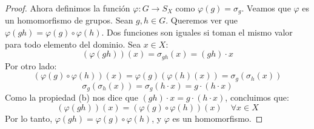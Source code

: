 \begin{proof}
    Ahora definimos la función $\varphi: G \to S_X$ como $\varphi(g) = \sigma_g$.
    Veamos que $\varphi$ es un homomorfismo de grupos.
    Sean $g, h \in G$. Queremos ver que $\varphi(gh) = \varphi(g) \circ \varphi(h)$.
    Dos funciones son iguales si toman el mismo valor para todo elemento del dominio. Sea $x \in X$:
    \begin{equation*}
        (\varphi(gh))(x) = \sigma_{gh}(x) = (gh) \cdot x
    \end{equation*}
    Por otro lado:
    \begin{equation*}
        (\varphi(g) \circ \varphi(h))(x) = \varphi(g)(\varphi(h)(x)) = \sigma_g(\sigma_h(x))
    \end{equation*}
    \begin{equation*}
        \sigma_g(\sigma_h(x)) = \sigma_g(h \cdot x) = g \cdot (h \cdot x)
    \end{equation*}
    Como la propiedad (b) nos dice que $(gh) \cdot x = g \cdot (h \cdot x)$, concluimos que:
    \begin{equation*}
        (\varphi(gh))(x) = (\varphi(g) \circ \varphi(h))(x) \quad \forall x \in X
    \end{equation*}
    Por lo tanto, $\varphi(gh) = \varphi(g) \circ \varphi(h)$, y $\varphi$ es un homomorfismo.
\end{proof}

